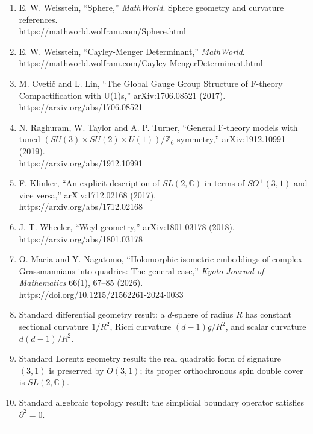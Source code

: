 \documentclass[
  a4paper,
]{ltjsarticle}
\begin{document}
\begin{enumerate}
\def\labelenumi{\arabic{enumi}.}
\item
  E. W. Weisstein, ``Sphere,'' \emph{MathWorld}. Sphere geometry and
  curvature references.\\
  https://mathworld.wolfram.com/Sphere.html
\item
  E. W. Weisstein, ``Cayley-Menger Determinant,'' \emph{MathWorld}.\\
  https://mathworld.wolfram.com/Cayley-MengerDeterminant.html
\item
  M. Cvetič and L. Lin, ``The Global Gauge Group Structure of F-theory
  Compactification with U(1)s,'' arXiv:1706.08521 (2017).\\
  https://arxiv.org/abs/1706.08521
\item
  N. Raghuram, W. Taylor and A. P. Turner, ``General F-theory models
  with tuned \((SU(3)\times SU(2)\times U(1))/\mathbb Z_6\) symmetry,''
  arXiv:1912.10991 (2019).\\
  https://arxiv.org/abs/1912.10991
\item
  F. Klinker, ``An explicit description of \(SL(2,\mathbb C)\) in terms
  of \(SO^+(3,1)\) and vice versa,'' arXiv:1712.02168 (2017).\\
  https://arxiv.org/abs/1712.02168
\item
  J. T. Wheeler, ``Weyl geometry,'' arXiv:1801.03178 (2018).\\
  https://arxiv.org/abs/1801.03178
\item
  O. Macia and Y. Nagatomo, ``Holomorphic isometric embeddings of
  complex Grassmannians into quadrics: The general case,'' \emph{Kyoto
  Journal of Mathematics} 66(1), 67--85 (2026).\\
  https://doi.org/10.1215/21562261-2024-0033
\item
  Standard differential geometry result: a \(d\)-sphere of radius \(R\)
  has constant sectional curvature \(1/R^2\), Ricci curvature
  \((d-1)g/R^2\), and scalar curvature \(d(d-1)/R^2\).
\item
  Standard Lorentz geometry result: the real quadratic form of signature
  \((3,1)\) is preserved by \(O(3,1)\); its proper orthochronous spin
  double cover is \(SL(2,\mathbb C)\).
\item
  Standard algebraic topology result: the simplicial boundary operator
  satisfies \(\partial^2=0\).
\end{enumerate}

\begin{center}\rule{0.5\linewidth}{0.5pt}\end{center}
\end{document}
